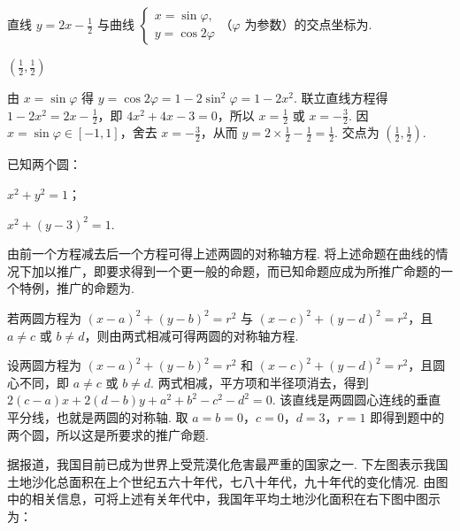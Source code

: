 \begin{problem}
直线 \(y=2x-\frac12\) 与曲线 \(\begin{cases}
x=\sin\varphi,\\
y=\cos2\varphi
\end{cases}\)（\(\varphi\) 为参数）的交点坐标为\fillinblank{}.
\end{problem}

\begin{answer}
\(\left(\frac12,\frac12\right)\)
\end{answer}

\begin{solution}
由 \(x=\sin\varphi\) 得 \(y=\cos2\varphi=1-2\sin^2\varphi=1-2x^2\). 联立直线方程得 \(1-2x^2=2x-\frac12\)，即 \(4x^2+4x-3=0\)，所以 \(x=\frac12\) 或 \(x=-\frac32\). 因 \(x=\sin\varphi\in[-1,1]\)，舍去 \(x=-\frac32\)，从而 \(y=2\times\frac12-\frac12=\frac12\). 交点为 \(\left(\frac12,\frac12\right)\).
\end{solution}

\begin{problem}
已知两个圆：
\begin{circlelist}
\item \(x^2+y^2=1\)；
\item \(x^2+(y-3)^2=1\).
\end{circlelist}
由前一个方程减去后一个方程可得上述两圆的对称轴方程. 将上述命题在曲线的情况下加以推广，即要求得到一个更一般的命题，而已知命题应成为所推广命题的一个特例，推广的命题为\fillinblank{}.
\end{problem}

\begin{answer}
若两圆方程为 \((x-a)^2+(y-b)^2=r^2\) 与 \((x-c)^2+(y-d)^2=r^2\)，且 \(a\ne c\) 或 \(b\ne d\)，则由两式相减可得两圆的对称轴方程.
\end{answer}

\begin{solution}
设两圆方程为 \((x-a)^2+(y-b)^2=r^2\) 和 \((x-c)^2+(y-d)^2=r^2\)，且圆心不同，即 \(a\ne c\) 或 \(b\ne d\). 两式相减，平方项和半径项消去，得到 \(2(c-a)x+2(d-b)y+a^2+b^2-c^2-d^2=0\). 该直线是两圆圆心连线的垂直平分线，也就是两圆的对称轴. 取 \(a=b=0\)，\(c=0\)，\(d=3\)，\(r=1\) 即得到题中的两个圆，所以这是所要求的推广命题.
\end{solution}

\begin{problem}
据报道，我国目前已成为世界上受荒漠化危害最严重的国家之一. 下左图表示我国土地沙化总面积在上个世纪五六十年代，七八十年代，九十年代的变化情况. 由图中的相关信息，可将上述有关年代中，我国年平均土地沙化面积在右下图中图示为：\fillinblank{}

\end{problem}

